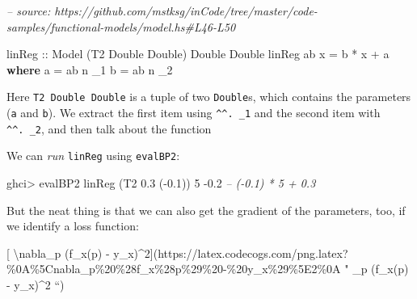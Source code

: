 \documentclass[]{article}
\newenvironment{Shaded}{}{}
\newcommand{\CommentTok}[1]{\textcolor[rgb]{0.38,0.63,0.69}{\textit{#1}}}
\newcommand{\DataTypeTok}[1]{\textcolor[rgb]{0.56,0.13,0.00}{#1}}
\newcommand{\DecValTok}[1]{\textcolor[rgb]{0.25,0.63,0.44}{#1}}
\newcommand{\FloatTok}[1]{\textcolor[rgb]{0.25,0.63,0.44}{#1}}
\newcommand{\FunctionTok}[1]{\textcolor[rgb]{0.02,0.16,0.49}{#1}}
\newcommand{\KeywordTok}[1]{\textcolor[rgb]{0.00,0.44,0.13}{\textbf{#1}}}
\newcommand{\NormalTok}[1]{#1}
\newcommand{\OtherTok}[1]{\textcolor[rgb]{0.00,0.44,0.13}{#1}}
\begin{document}
\begin{Shaded}
\begin{Highlighting}[]
\CommentTok{-- source: https://github.com/mstksg/inCode/tree/master/code-samples/functional-models/model.hs#L46-L50}

\OtherTok{linReg ::} \DataTypeTok{Model}\NormalTok{ (}\DataTypeTok{T2} \DataTypeTok{Double} \DataTypeTok{Double}\NormalTok{) }\DataTypeTok{Double} \DataTypeTok{Double}
\NormalTok{linReg ab x }\FunctionTok{=}\NormalTok{ b }\FunctionTok{*}\NormalTok{ x }\FunctionTok{+}\NormalTok{ a}
  \KeywordTok{where}
\NormalTok{    a }\FunctionTok{=}\NormalTok{ ab }\FunctionTok{^^.}\NormalTok{ _1}
\NormalTok{    b }\FunctionTok{=}\NormalTok{ ab }\FunctionTok{^^.}\NormalTok{ _2}
\end{Highlighting}
\end{Shaded}

Here \texttt{T2\ Double\ Double} is a tuple of two \texttt{Double}s, which
contains the parameters (\texttt{a} and \texttt{b}). We extract the first item
using \texttt{\^{}\^{}.\ \_1} and the second item with \texttt{\^{}\^{}.\ \_2},
and then talk about the function

We can \emph{run} \texttt{linReg} using \texttt{evalBP2}:

\begin{Shaded}
\begin{Highlighting}[]
\NormalTok{ghci}\FunctionTok{>}\NormalTok{ evalBP2 linReg (}\DataTypeTok{T2} \FloatTok{0.3}\NormalTok{ (}\FunctionTok{-}\FloatTok{0.1}\NormalTok{)) }\DecValTok{5}
\FunctionTok{-}\FloatTok{0.2}        \CommentTok{-- (-0.1) * 5 + 0.3}
\end{Highlighting}
\end{Shaded}

But the neat thing is that we can also get the gradient of the parameters, too,
if we identify a loss function:

{[} \textbackslash{}nabla\_p (f\_x(p) -
y\_x)\^{}2{]}(https://latex.codecogs.com/png.latex?\%0A\%5Cnabla\_p\%20\%28f\_x\%28p\%29\%20-\%20y\_x\%29\%5E2\%0A
" \nabla\_p (f\_x(p) - y\_x)\^{}2 ``)

\begin{Shaded}
\end{Shaded}
\end{document}
